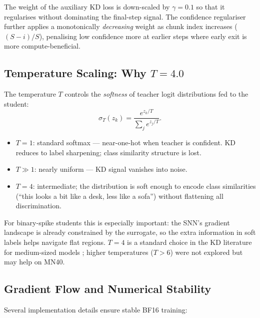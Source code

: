 \documentclass[11pt,a4paper]{article}
\begin{document}
The weight of the auxiliary KD loss is down-scaled by $\gamma = 0.1$ so that it regularises without dominating the final-step signal. The confidence regulariser further applies a monotonically \emph{decreasing} weight as chunk index increases ($(S-i)/S$), penalising low confidence more at earlier steps where early exit is more compute-beneficial.

\subsection{Temperature Scaling: Why $T = 4.0$}

The temperature $T$ controls the \emph{softness} of teacher logit distributions fed to the student:
\[
\sigma_T(z_k) = \frac{e^{z_k/T}}{\sum_j e^{z_j/T}}.
\]
\begin{itemize}
  \item $T=1$: standard softmax — near-one-hot when teacher is confident. KD reduces to label sharpening; class similarity structure is lost.
  \item $T \gg 1$: nearly uniform — KD signal vanishes into noise.
  \item $T=4$: intermediate; the distribution is soft enough to encode class similarities (``this looks a bit like a desk, less like a sofa'') without flattening all discrimination.
\end{itemize}

For binary-spike students this is especially important: the SNN's gradient landscape is already constrained by the surrogate, so the extra information in soft labels helps navigate flat regions. $T=4$ is a standard choice in the KD literature for medium-sized models \cite{hinton2015distilling}; higher temperatures ($T>6$) were not explored but may help on MN40.

\subsection{Gradient Flow and Numerical Stability}

Several implementation details ensure stable BF16 training:
\end{document}
